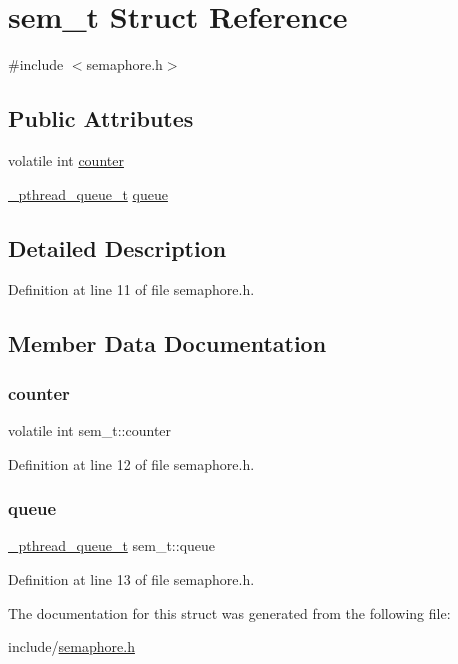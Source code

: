 \hypertarget{structsem__t}{}\section{sem\+\_\+t Struct Reference}
\label{structsem__t}


{\ttfamily \#include $<$semaphore.\+h$>$}

\subsection*{Public Attributes}
\begin{DoxyCompactItemize}
\item 
volatile int \mbox{\hyperlink{structsem__t_a87447fa9179cdd758e4831231f5d7f4c}{counter}}
\item 
\mbox{\hyperlink{pthread_8h_a547e924a1dbc72063242456b6390011e}{\+\_\+pthread\+\_\+queue\+\_\+t}} \mbox{\hyperlink{structsem__t_aaa8b060736a55b5c68d64e88f40ecf3c}{queue}}
\end{DoxyCompactItemize}


\subsection{Detailed Description}


Definition at line 11 of file semaphore.\+h.



\subsection{Member Data Documentation}
\mbox{\label{structsem__t_a87447fa9179cdd758e4831231f5d7f4c}} 
\subsubsection{\texorpdfstring{counter}{counter}}
{\footnotesize\ttfamily volatile int sem\+\_\+t\+::counter}



Definition at line 12 of file semaphore.\+h.

\mbox{\label{structsem__t_aaa8b060736a55b5c68d64e88f40ecf3c}} 
\subsubsection{\texorpdfstring{queue}{queue}}
{\footnotesize\ttfamily \mbox{\hyperlink{pthread_8h_a547e924a1dbc72063242456b6390011e}{\+\_\+pthread\+\_\+queue\+\_\+t}} sem\+\_\+t\+::queue}



Definition at line 13 of file semaphore.\+h.



The documentation for this struct was generated from the following file\+:\begin{DoxyCompactItemize}
\item 
include/\mbox{\hyperlink{semaphore_8h}{semaphore.\+h}}\end{DoxyCompactItemize}
